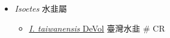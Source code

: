 
  \begin{itemize}
 \item[    ] \textit{Isoetes} 水韭屬
                                
  \begin{itemize}
        \item[] \href{http://www.theplantlist.org/tpl1.1/search?q=Isoetes+taiwanensis}{\textit{I. taiwanensis} DeVol}   臺灣水韭  \# CR
  \end{itemize}
  \end{itemize}
